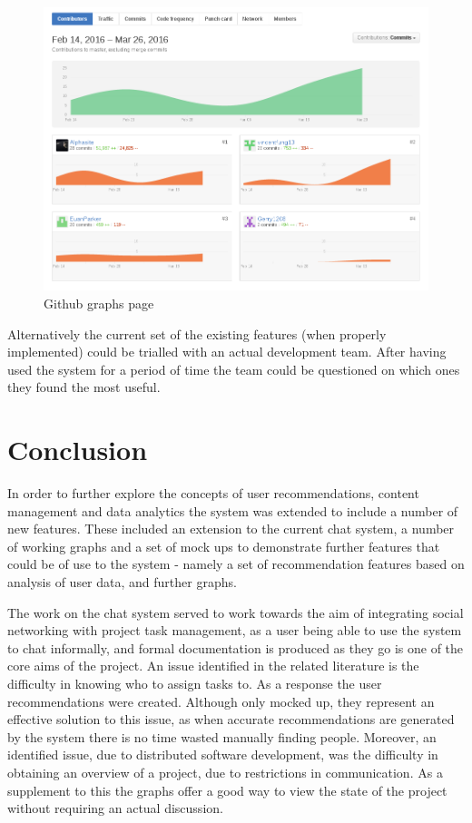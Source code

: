 \documentclass{l4proj}
\begin{document}
\begin{figure}[h]
\includegraphics[scale = 0.7]{github-example.png}
\centering
\caption{Github graphs page}
\label{fig:14}
\end{figure}

Alternatively the current set of the existing features (when properly implemented) could be trialled with an actual development team.  After having used the system for a period of time the team could be questioned on which ones they found the most useful. 

\chapter{Conclusion}

In order to further explore the concepts of user recommendations, content management and data analytics the system was extended to include a number of new features.  These included an extension to the current chat system, a number of working graphs and a set of mock ups to demonstrate further features that could be of use to the system - namely a set of recommendation features based on analysis of user data, and further graphs.  

The work on the chat system served to work towards the aim of integrating social networking with project task management, as a user being able to use the system to chat informally, and formal documentation is produced as they go is one of the core aims of the project. An issue identified in the related literature is the difficulty in knowing who to assign tasks to.  As a response the user recommendations were created.  Although only mocked up, they represent an effective solution to this issue, as when accurate recommendations are generated by the system there is no time wasted manually finding people.  Moreover, an identified issue, due to distributed software development, was the difficulty in obtaining an overview of a project, due to restrictions in communication.  As a supplement to this the graphs offer a good way to view the state of the project without requiring an actual discussion. 
\end{document}

